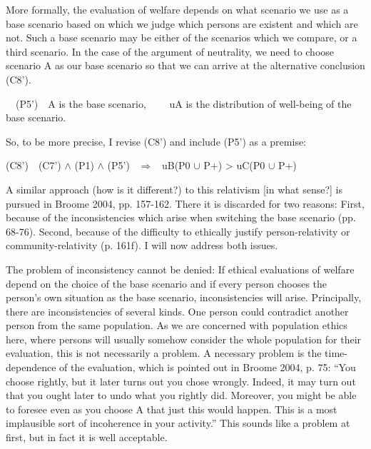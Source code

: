 More formally, the evaluation of welfare depends on what scenario we use as a base scenario based on which we judge which persons are existent and which are not. Such a base scenario may be either of the scenarios which we compare, or a third scenario. In the case of the argument of neutrality, we need to choose scenario A as our base scenario so that we can arrive at the alternative conclusion (C8’). 

\ \ (P5’)\ \ A is the base scenario, \newline \ \ \ \ uA is the distribution of well-being of the base scenario.  

So, to be more precise, I revise (C8’) and include (P5’) as a premise:  

(C8’)\ \ (C7’) ${\wedge}$ (P1) ${\wedge}$ (P5’) \ $\Rightarrow $ \ uB(P0 ${\cup}$ P+) {\textgreater} uC(P0 ${\cup}$ P+) 

A similar approach (how is it different?) to this relativism [in what sense?] is pursued in \label{ref:RNDLLbEezdHvh}Broome 2004, pp. 157-162. There it is discarded for two reasons: First, because of the inconsistencies which arise when switching the base scenario (pp. 68-76). Second, because of the difficulty to ethically justify person-relativity or community-relativity (p. 161f). I will now address both issues.  

The problem of inconsistency cannot be denied: If ethical evaluations of welfare depend on the choice of the base scenario and if every person chooses the person’s own situation as the base scenario, inconsistencies will arise. Principally, there are inconsistencies of several kinds. One person could contradict another person from the same population. As we are concerned with population ethics here, where persons will usually somehow consider the whole population for their evaluation, this is not necessarily a problem. A necessary problem is the time-dependence of the evaluation, which is pointed out in \label{ref:RND8yvQ79TSk8}Broome 2004, p. 75: “You choose rightly, but it later turns out you chose wrongly. Indeed, it may turn out that you ought later to undo what you rightly did. Moreover, you might be able to foresee even as you choose A that just this would happen. This is a most implausible sort of incoherence in your activity.” This sounds like a problem at first, but in fact it is well acceptable.  

